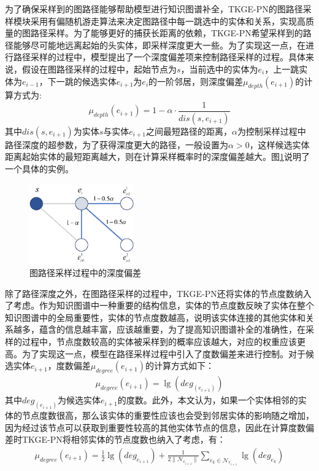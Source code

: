 为了确保采样到的图路径能够帮助模型进行知识图谱补全，TKGE-PN的图路径采样模块采用有偏随机游走算法来决定图路径中每一跳选中的实体和关系，实现高质量的图路径采样。为了能够更好的捕获长距离的依赖，TKGE-PN希望采样到的路径能够尽可能地远离起始的头实体，即采样深度更大一些。为了实现这一点，在进行路径采样的过程中，模型提出了一个深度偏差项来控制路径采样的过程。具体来说，假设在图路径采样的过程中，起始节点为$s$，当前选中的实体为$e_i$，上一跳实体为$e_{i-1}$，下一跳的候选实体$e_{i+1}$为$e_i$的一阶邻居，则深度偏差$\mu_{depth}(e_{i+1})$的计算方式为:
\begin{equation}
  \mu_{depth}(e_{i+1})=1-\alpha\cdot\frac{1}{dis(s,e_{i+1})}
\end{equation}
其中$dis(s,e_{i+1})$为实体$s$与实体$e_{i+1}$之间最短路径的距离，$\alpha$为控制采样过程中路径深度的超参数，为了获得深度更大的路径，一般设置为$\alpha>0$，这样候选实体距离起始实体的最短距离越大，则在计算采样概率时的深度偏差越大。图\ref{depth_bias}说明了一个具体的实例。

\begin{figure}[htbp]
  \centerline{\includegraphics[width=0.4\textwidth]{pic/depth_bias.pdf}}
  \caption{图路径采样过程中的深度偏差}
  \label{depth_bias}
\end{figure}

除了路径深度之外，在图路径采样的过程中，TKGE-PN还将实体的节点度数纳入了考虑。作为知识图谱中一种重要的结构信息，实体的节点度数反映了实体在整个知识图谱中的全局重要性，实体的节点度数越高，说明该实体连接的其他实体和关系越多，蕴含的信息越丰富，应该越重要，为了提高知识图谱补全的准确性，在采样的过程中，节点度数较高的实体被采样到的概率应该越大，对应的权重应该更高。为了实现这一点，模型在路径采样过程中引入了度数偏差来进行控制。对于候选实体$e_{i+1}$，度数偏差$\mu_{degree}(e_{i+1})$的计算方式如下：
\begin{gather}
  \mu_{degree}(e_{i+1})=\lg(deg_{(e_{i+1})})
\end{gather}
其中$deg_{(e_{i+1})}$为候选实体$e_{i+1}$的度数。此外，本文认为，如果一个实体相邻的实体的节点度数很高，那么该实体的重要性应该也会受到邻居实体的影响随之增加，因为经过该节点可以获取到重要性较高的其他实体节点的信息，因此在计算度数偏差时TKGE-PN将相邻实体的节点度数也纳入了考虑，有：
\begin{gather}
  \mu_{degree}(e_{i+1})=\frac{1}{2}\lg(deg_{e_{i+1}})+\frac{1}{2\|\mathcal{N}_{e_{i+1}}\|}\sum_{e_k\in\mathcal{N}_{e_{i+1}}}\lg(deg_{e_k})
\end{gather}

